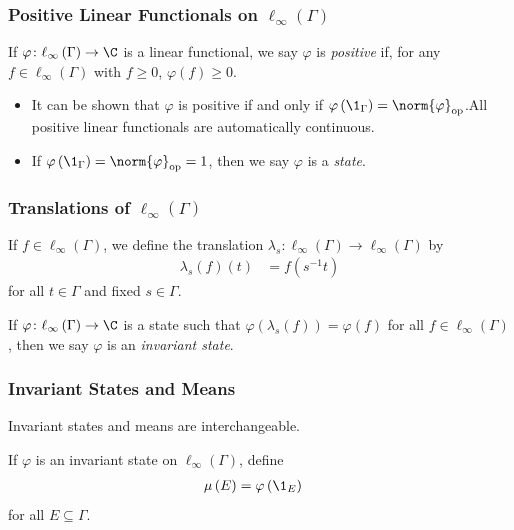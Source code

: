 \documentclass{beamer-custom}
\DeclareMathOperator{\op}{op}
\begin{document}
\begin{frame}
  \frametitle{Positive Linear Functionals on $\ell_{\infty}\left( \Gamma \right)$}
  If $\varphi\colon \ell_{\infty}\left( \Gamma \right)\rightarrow \C$ is a linear functional, we say $\varphi $ is \textit{positive} if, for any $f\in \ell_{\infty}\left( \Gamma \right)$ with $f \geq 0$, $\varphi(f)\geq 0$.
  \begin{itemize}
    \item It can be shown that $\varphi$ is positive if and only if $\varphi\left( \1_{\Gamma} \right) = \norm{\varphi}_{\op}$.\pause\:All positive linear functionals are automatically continuous.
    \item If $\varphi\left( \1_{\Gamma} \right) = \norm{\varphi}_{\op} = 1$, then we say $\varphi$ is a \textit{state}.
  \end{itemize}
\end{frame}
\begin{frame}
  \frametitle{Translations of $\ell_{\infty}\left( \Gamma \right)$}
  If $f\in \ell_{\infty}\left( \Gamma \right)$, we define the translation $\lambda_s\colon \ell_{\infty}\left( \Gamma \right)\rightarrow \ell_{\infty}\left( \Gamma \right)$ by
  \begin{align*}
    \lambda_s(f)(t) &= f\left( s^{-1}t \right)
  \end{align*}
  for all $t\in \Gamma$ and fixed $s\in\Gamma$.\pause\newline

  If $\varphi\colon \ell_{\infty}\left( \Gamma \right)\rightarrow \C$ is a state such that $\varphi\left( \lambda_s(f) \right) = \varphi(f)$ for all $f\in \ell_{\infty}\left( \Gamma \right)$, then we say $\varphi$ is an \textit{invariant state}.
\end{frame}
\begin{frame}
  \frametitle{Invariant States and Means}
  Invariant states and means are interchangeable.\pause\newline

  If $\varphi$ is an invariant state on $\ell_{\infty}\left( \Gamma \right)$, define
  \begin{align*}
    \mu\left( E \right) &= \varphi\left( \1_{E} \right)
  \end{align*}
  for all $E\subseteq \Gamma$.
\end{frame}
\end{document}
